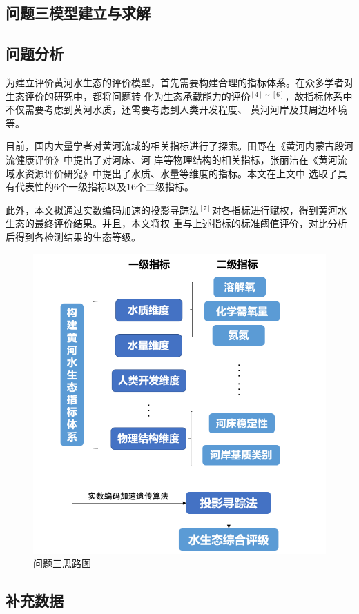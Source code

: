 \documentclass{whutmod}
\begin{document}
\begin{spacing}{1.2}
\section{问题三模型建立与求解}


\subsection{问题分析}
为建立评价黄河水生态的评价模型，首先需要构建合理的指标体系。在众多学者对生态评价的研究中，都将问题转
化为生态承载能力的评价$^{[4]\sim[6]}$，故指标体系中不仅需要考虑到黄河水质，还需要考虑到人类开发程度、
黄河河岸及其周边环境等。

目前，国内大量学者对黄河流域的相关指标进行了探索。田野在《黄河内蒙古段河流健康评价》中提出了对河床、河
岸等物理结构的相关指标，张丽洁在《黄河流域水资源评价研究》中提出了水质、水量等维度的指标。本文在上文中
选取了具有代表性的6个一级指标以及16个二级指标。

此外，本文拟通过实数编码加速的投影寻踪法$^{[7]}$对各指标进行赋权，得到黄河水生态的最终评价结果。并且，本文将权
重与上述指标的标准阈值评价，对比分析后得到各检测结果的生态等级。

\begin{figure}[H]
	\centering
	\includegraphics[width=.8\textwidth]{问题三思路图.png}
	\caption{问题三思路图}
	\label{变化趋势}
\end{figure}

\subsection{补充数据}



\end{spacing}
\end{document}

